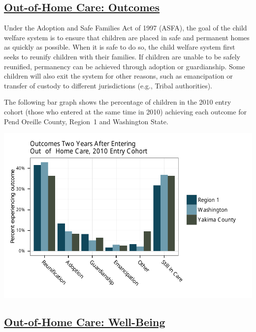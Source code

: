 \documentclass{article}\usepackage[]{graphicx}\usepackage[]{color}
\makeatletter
\def\maxwidth{ %
  \ifdim\Gin@nat@width>\linewidth
    \linewidth
  \else
    \Gin@nat@width
  \fi
}
\newenvironment{knitrout}{}{} %
\makeatother
\begin{document}
\subsection{\href{http://www.partnersforourchildren.org/child-well-being/visualizations/out-home-care/outcomes}
    {Out-of-Home Care: Outcomes}
}
Under the Adoption and Safe Families Act of 1997 (ASFA), the goal of the child welfare system is to ensure that children are placed in safe and permanent homes as quickly as possible. When it is safe to do so, the child welfare system first seeks to reunify children with their families. If children are unable to be safely reunified, permanency can be achieved through adoption or guardianship. Some children will also exit the system for other reasons, such as emancipation or transfer of custody to different jurisdictions (e.g., Tribal authorities).

The following bar graph shows the percentage of children in the 2010 entry cohort (those who entered at the same time in 2010) achieving each outcome for Pend Oreille County, Region~1 and Washington State.
\nopagebreak[3]
\begin{knitrout}
\color{fgcolor}

{\centering \includegraphics[width=\maxwidth]{figure/ooh_outcomes} 

}



\end{knitrout}


\newpage

\subsection{\href{http://www.partnersforourchildren.org/child-well-being/visualizations/out-home-care/well-being}
    {Out-of-Home Care: Well-Being}
}
\end{document}
